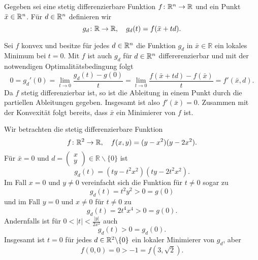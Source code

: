 
Gegeben sei eine stetig differenzierbare Funktion $f\colon \mathbb{R}^n\to\mathbb{R}$ und ein Punkt $\bar x\in\mathbb{R}^n$.
Für $d\in\mathbb{R}^n$ definieren wir
\begin{displaymath}
 g_d\colon \mathbb{R}\to\mathbb{R} , \quad g_d(t)=f(\bar x+td). 
\end{displaymath}
\begin{compactenum}[(i)]
 \item Sei $f$ konvex und besitze für jedes $d\in\mathbb{R}^n$ die Funktion $g_d$ in $\bar x\in\mathbb{R}$ ein lokales Minimum bei $t=0$.
 Mit $f$ ist auch $g_d$ für $d\in \mathbb{R}^n$ differerenzierbar und mit der notwendigen Optimalitätsbedingung folgt
 \begin{displaymath}
  0=g_d'(0)=\lim_{t\to 0} \frac{g_d(t)-g(0)}{t}=\lim_{t\to0}\frac{f(\bar x+td)-f(\bar x)}{t}=f'(\bar x,d).
 \end{displaymath}
 Da $f$ stetig differenzierbar ist, so ist die Ableitung in einem Punkt durch die partiellen Ableitungen gegeben.
 Insgesamt ist also $f'(\bar x)=0$. Zusammen mit der Konvexität folgt bereits, dass $\bar x$ ein Minimierer von $f$ ist.
 \\
 \item Wir betrachten die stetig differenzierbare Funktion
 \begin{displaymath}
 f\colon \mathbb{R}^2\to\mathbb{R},\quad f(x,y)=(y-x^2)(y-2x^2).
 \end{displaymath}
 Für $\bar x=0$ und $d=\begin{pmatrix}x\\y\end{pmatrix}\in\mathbb{R}\backslash\{0\}$ ist 
 \begin{displaymath}
  g_d(t)=(ty-t^2x^2)(ty-2t^2x^2).
 \end{displaymath} 
 Im Fall $x=0$ und $y\neq 0$ vereinfacht sich die Funktion für $t\neq 0$ sogar zu
 \begin{displaymath}
  g_d(t)=t^2y^2>0=g(0)
 \end{displaymath}
 und im Fall $y=0$ und $x\neq 0$ für $t\neq 0$ zu
 \begin{displaymath}
   g_d(t)=2t^4x^4>0=g(0).
 \end{displaymath}
 Andernfalls ist für $0<|t|<\frac{|y|}{2x^2}$ auch
 \begin{displaymath}
  g_d(t)>0=g_d(0).
 \end{displaymath}
Insgesamt ist $t=0$ für jedes $d\in\mathbb{R}^2\backslash\{0\}$ ein lokaler Minimierer von $g_d$, aber
 \begin{displaymath}
  f(0,0)=0>-1=f(3,\sqrt{2}).
 \end{displaymath}
\end{compactenum}
